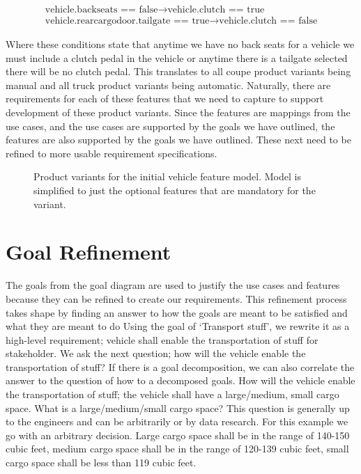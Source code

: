 \begin{gather}
	\text{vehicle.backseats == false} \rightarrow \text{vehicle.clutch == true}\\
	\text{vehicle.rearcargodoor.tailgate == true} \rightarrow \text{vehicle.clutch == false}
\end{gather}

Where these conditions state that anytime we have no back seats for a vehicle we must include a clutch pedal in the vehicle or anytime there is a tailgate selected there will be no clutch pedal. This translates to all coupe product variants being manual and all truck product variants being automatic. Naturally, there are requirements for each of these features that we need to capture to support development of these product variants. Since the features are mappings from the use cases, and the use cases are supported by the goals we have outlined, the features are also supported by the goals we have outlined. These next need to be refined to more usable requirement specifications.

\begin{figure}
	\centering
	
	\caption{Product variants for the initial vehicle feature model. Model is simplified to just the optional features that are mandatory for the variant.}
	\label{fig:veh_variants}
\end{figure}

\section{Goal Refinement}

The goals from the goal diagram are used to justify the use cases and features because they can be refined to create our requirements. This refinement process takes shape by finding an answer to how the goals are meant to be satisfied and what they are meant to do Using the goal of `Transport stuff', we rewrite it as a high-level requirement; vehicle shall enable the transportation of stuff for stakeholder. We ask the next question; how will the vehicle enable the transportation of stuff? If there is a goal decomposition, we can also correlate the answer to the question of how to a decomposed goals. How will the vehicle enable the transportation of stuff; the vehicle shall have a large/medium, small cargo space. What is a large/medium/small cargo space? This question is generally up to the engineers and can be arbitrarily or by data research. For this example we go with an arbitrary decision. Large cargo space shall be in the range of 140-150 cubic feet, medium cargo space shall be in the range of 120-139 cubic feet, small cargo space shall be less than 119 cubic feet.

